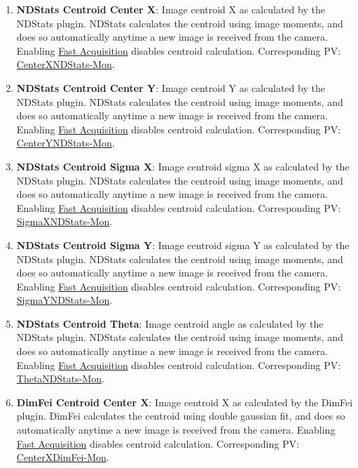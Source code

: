 \documentclass[openany]{article}
\begin{document}
        \begin{enumerate}
            \item \textbf{NDStats Centroid Center X}: Image centroid X as calculated by the NDStats plugin. NDStats calculates the centroid using image moments, and does so automatically anytime a new image is received from the camera. Enabling \hyperref[seq:fast-acq]{Fast Acquisition} disables centroid calculation. Corresponding PV: \hyperlink{pv:center-x-ndstats}{CenterXNDStats-Mon}.
            \item \textbf{NDStats Centroid Center Y}: Image centroid Y as calculated by the NDStats plugin. NDStats calculates the centroid using image moments, and does so automatically anytime a new image is received from the camera. Enabling \hyperref[seq:fast-acq]{Fast Acquisition} disables centroid calculation. Corresponding PV: \hyperlink{pv:center-y-ndstats}{CenterYNDStats-Mon}.
            \item \textbf{NDStats Centroid Sigma X}: Image centroid sigma X as calculated by the NDStats plugin. NDStats calculates the centroid using image moments, and does so automatically anytime a new image is received from the camera. Enabling \hyperref[seq:fast-acq]{Fast Acquisition} disables centroid calculation. Corresponding PV: \hyperlink{pv:sigma-x-ndstats}{SigmaXNDStats-Mon}.
            \item \textbf{NDStats Centroid Sigma Y}: Image centroid sigma Y as calculated by the NDStats plugin. NDStats calculates the centroid using image moments, and does so automatically anytime a new image is received from the camera. Enabling \hyperref[seq:fast-acq]{Fast Acquisition} disables centroid calculation. Corresponding PV: \hyperlink{pv:sigma-y-ndstats}{SigmaYNDStats-Mon}.
            \item \textbf{NDStats Centroid Theta}: Image centroid angle as calculated by the NDStats plugin. NDStats calculates the centroid using image moments, and does so automatically anytime a new image is received from the camera. Enabling \hyperref[seq:fast-acq]{Fast Acquisition} disables centroid calculation. Corresponding PV: \hyperlink{pv:theta-ndstats}{ThetaNDStats-Mon}.
            \item \textbf{DimFei Centroid Center X}: Image centroid X as calculated by the DimFei plugin. DimFei calculates the centroid using double gaussian fit, and does so automatically anytime a new image is received from the camera. Enabling \hyperref[seq:fast-acq]{Fast Acquisition} disables centroid calculation. Corresponding PV: \hyperlink{pv:center-x-dimfei}{CenterXDimFei-Mon}.

\end{enumerate}
\end{document}
